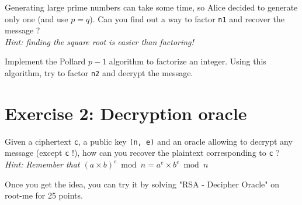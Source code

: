 \documentclass[english,a4paper,11pt]{exam}
\begin{document}
	\begin{questions}
	
	\question Generating large prime numbers can take some time, so Alice decided to generate only one (and use $p=q$). Can you find out a way to factor \texttt{n1} and recover the message ?\\
	\emph{Hint: finding the square root is easier than factoring!}
		
	\question Implement the Pollard $p-1$ algorithm to factorize an integer.
	\question Using this algorithm, try to factor \texttt{n2} and decrypt the message.
	
	\end{questions}
	
	\section*{Exercise 2: Decryption oracle}
	
	Given a ciphertext \texttt{c}, a public key \texttt{(n, e)} and an oracle allowing to decrypt any message (except \texttt{c} !), how can you recover the plaintext corresponding to \texttt{c} ?\\
	\emph{Hint: Remember that $(a\times b)^e\bmod n = a^e \times b^e \bmod n$}
	\vspace*{0.5cm}
	
	\noindent Once you get the idea, you can try it by solving "RSA - Decipher Oracle" on root-me for 25 points.

	
\end{document}
